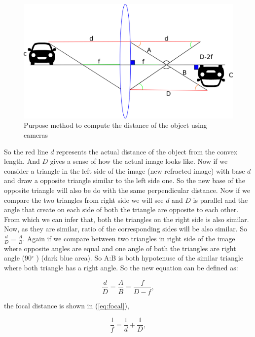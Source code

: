\begin{figure}[H]
\centering
\includegraphics[width=\textwidth]{imagens/desenhando.png}
\caption{Purpose method to compute the distance of the object using cameras}
\label{fig:distance}
\end{figure}


So the red line $d$ represents the actual distance of the object from the convex length. And $D$ gives a sense of how the actual image looks like. Now if we consider a triangle in the left side of the image (new refracted image) with base $d$ and draw a opposite triangle similar to the left side one. So the new base of the opposite triangle will also be do with the same perpendicular distance. Now if we compare the two triangles from right side we will see $d$ and $D$ is parallel and the angle that create on each side of both the triangle are opposite to each other. From which we can infer that, both the triangles on the right side is also similar. Now, as they are similar, ratio of the corresponding sides will be also similar. So $\frac{d}{D} = \frac{A}{B}$. Again if we compare between two triangles in right side of the image where opposite angles are equal and one angle of both the triangles are right angle (90$^{\circ}$ ) (dark blue area). So A:B is both hypotenuse of the similar triangle where both triangle has a right angle. So the new equation can be defined as:

    \begin{equation}\label{eq:meausure}
        \frac{d}{D} = \frac{A}{B} = \frac{f}{D-f},
    \end{equation}

 the focal distance is shown in (\ref{eq:focal}), 

\begin{equation}\label{eq:focal}
    \frac{1}{f} = \frac{1}{d} + \frac{1}{D},
\end{equation}

